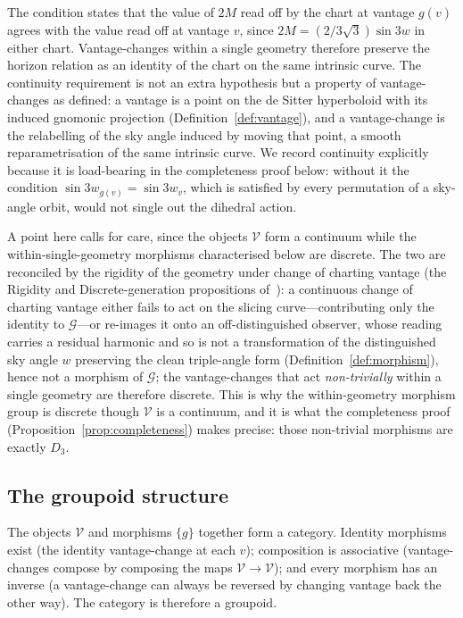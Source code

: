 \documentclass[11pt,a4paper]{article}
\theoremstyle{definition}
\begin{document}
The condition states that the value of $2M$ read off by the chart at vantage $g(v)$ agrees with the value read off at vantage $v$, since $2M=(2/3\sqrt{3})\sin 3w$ in either chart. Vantage-changes within a single geometry therefore preserve the horizon relation as an identity of the chart on the same intrinsic curve. The continuity requirement is not an extra hypothesis but a property of vantage-changes as defined: a vantage is a point on the de Sitter hyperboloid with its induced gnomonic projection (Definition~\ref{def:vantage}), and a vantage-change is the relabelling of the sky angle induced by moving that point, a smooth reparametrisation of the same intrinsic curve. We record continuity explicitly because it is load-bearing in the completeness proof below: without it the condition $\sin 3w_{g(v)}=\sin 3w_{v}$, which is satisfied by every permutation of a sky-angle orbit, would not single out the dihedral action.

A point here calls for care, since the objects $\mathcal{V}$ form a continuum while the within-single-geometry morphisms characterised below are discrete. The two are reconciled by the rigidity of the geometry under change of charting vantage (the Rigidity and Discrete-generation propositions of~\cite{JanzenSlicing}): a continuous change of charting vantage either fails to act on the slicing curve---contributing only the identity to $\mathcal{G}$---or re-images it onto an off-distinguished observer, whose reading carries a residual harmonic and so is not a transformation of the distinguished sky angle $w$ preserving the clean triple-angle form (Definition~\ref{def:morphism}), hence not a morphism of $\mathcal{G}$; the vantage-changes that act \emph{non-trivially} within a single geometry are therefore discrete. This is why the within-geometry morphism group is discrete though $\mathcal{V}$ is a continuum, and it is what the completeness proof (Proposition~\ref{prop:completeness}) makes precise: those non-trivial morphisms are exactly $D_{3}$.

\subsection{The groupoid structure}\label{sec:groupoid-structure}

The objects $\mathcal{V}$ and morphisms $\{g\}$ together form a category. Identity morphisms exist (the identity vantage-change at each $v$); composition is associative (vantage-changes compose by composing the maps $\mathcal{V}\to\mathcal{V}$); and every morphism has an inverse (a vantage-change can always be reversed by changing vantage back the other way). The category is therefore a groupoid.
\end{document}
